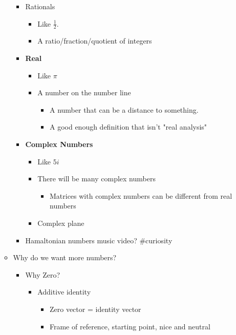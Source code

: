 \documentclass[letterpaper]{article}
\begin{document}
\begin{itemize}
\begin{itemize}
\begin{itemize}
\item Rationals

\begin{itemize}
\item Like \(\frac{1}{2}\).
\item A ratio/fraction/quotient of integers
\end{itemize}

\item \textbf{Real}

\begin{itemize}
\item Like \(\pi\)
\item A number on the number line

\begin{itemize}
\item A number that can be a distance to something.
\item A good enough definition that isn't "real analysis"
\end{itemize}
\end{itemize}

\item \textbf{Complex Numbers}

\begin{itemize}
\item Like \(5i\)
\item There will be many complex numbers

\begin{itemize}
\item Matrices with complex numbers can be different from real
numbers
\end{itemize}

\item Complex plane
\end{itemize}

\item Hamaltonian numbers music video? \#curiosity
\end{itemize}

\item Why do we want more numbers?

\begin{itemize}
\item Why Zero?

\begin{itemize}
\item Additive identity

\begin{itemize}
\item Zero vector = identity vector
\item Frame of reference, starting point, nice and neutral
\end{itemize}
\end{itemize}


\end{itemize}
\end{itemize}
\end{itemize}
\end{document}
